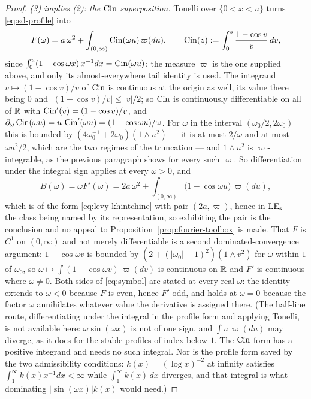 \begin{proof}
\emph{(3) implies (2): the $\operatorname{Cin}$ superposition.} Tonelli over $\{0 < x < u\}$ turns
\ref{eq:sd-profile} into
\begin{equation}\label{eq:cin-superposition}
  F(\omega) = a\,\omega^2 + \int_{(0,\infty)} \operatorname{Cin}(\omega u)\,\varpi(du),
  \qquad \operatorname{Cin}(z) := \int_0^{z}\frac{1 - \cos v}{v}\,dv,
\end{equation}
since $\int_0^u (1-\cos\omega x)\,x^{-1}dx = \operatorname{Cin}(\omega u)$; the measure $\varpi$ is the one
supplied above, and only its almost-everywhere tail identity is used. The integrand
$v \mapsto (1-\cos v)/v$ of $\operatorname{Cin}$ is continuous at the origin as well, its value there being
$0$ and $|(1-\cos v)/v| \le |v|/2$; so $\operatorname{Cin}$ is continuously differentiable on all of $\mathbb{R}$
with $\operatorname{Cin}'(v) = (1-\cos v)/v$, and
$\partial_\omega \operatorname{Cin}(\omega u) = u\,\operatorname{Cin}'(\omega u) = (1 - \cos\omega u)/\omega$. For $\omega$
in the interval $(\omega_0/2, 2\omega_0)$ this is bounded by
$(4\omega_0^{-1} + 2\omega_0)(1 \wedge u^2)$ --- it is at most $2/\omega$ and at most
$\omega u^2/2$, which are the two regimes of the truncation --- and $1 \wedge u^2$ is
$\varpi$-integrable, as the previous paragraph shows for every such $\varpi$. So
differentiation under the integral sign applies at every $\omega > 0$, and
\begin{equation}\label{eq:symbol}
  B(\omega) = \omega F'(\omega)
   = 2a\,\omega^2 + \int_{(0,\infty)} \bigl(1 - \cos\omega u\bigr)\,\varpi(du),
\end{equation}
which is of the form \ref{eq:levy-khintchine} with pair $(2a,\varpi)$, hence in $\mathrm{LE}_{\mathrm{s}}$ --- the
class being named by its representation, so exhibiting the pair is the conclusion and no appeal
to Proposition~\ref{prop:fourier-toolbox} is made. That $F$ is $C^1$ on $(0,\infty)$ and not
merely differentiable is a second dominated-convergence argument: $1 - \cos\omega v$ is
bounded by $(2 + (|\omega_0|+1)^2)(1 \wedge v^2)$ for $\omega$ within $1$ of $\omega_0$, so
$\omega \mapsto \int (1 - \cos\omega v)\,\varpi(dv)$ is continuous on $\mathbb{R}$ and $F' $ is
continuous where $\omega \ne 0$. Both sides of \ref{eq:symbol} are stated at every real
$\omega$: the identity extends to $\omega < 0$ because $F$ is even, hence $F'$ odd, and holds
at $\omega = 0$ because the factor $\omega$ annihilates whatever value the derivative is
assigned there. (The half-line route, differentiating under the integral in the profile form
and applying Tonelli, is not available here: $\omega\sin(\omega x)$ is not of one sign, and
$\int u\,\varpi(du)$ may diverge, as it does for the stable profiles of index below $1$. The
$\operatorname{Cin}$ form has a positive integrand and needs no such integral. Nor is the profile form saved
by the two admissibility conditions: $k(x) = (\log x)^{-2}$ at infinity satisfies
$\int_1^\infty k(x)x^{-1}dx < \infty$ while $\int_1^\infty k(x)\,dx$ diverges, and that
integral is what dominating $|\sin(\omega x)|k(x)$ would need.)


\end{proof}
